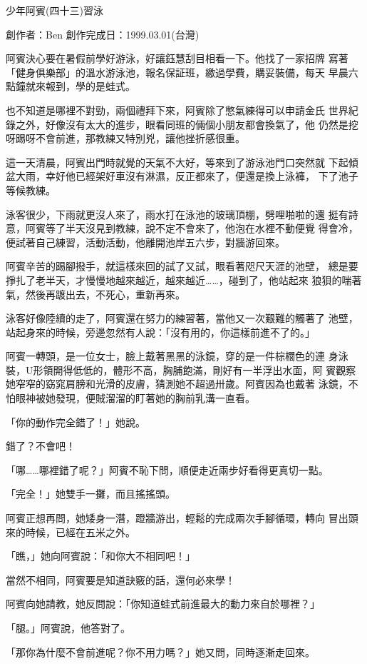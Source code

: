



少年阿賓(四十三)習泳

創作者：Ben
創作完成日：1999.03.01(台灣)


阿賓決心要在暑假前學好游泳，好讓鈺慧刮目相看一下。他找了一家招牌
寫著「健身俱樂部」的溫水游泳池，報名保証班，繳過學費，購妥裝備，每天
早晨六點鐘就來報到，學的是蛙式。

也不知道是哪裡不對勁，兩個禮拜下來，阿賓除了憋氣練得可以申請金氏
世界紀錄之外，好像沒有太大的進步，眼看同班的倆個小朋友都會換氣了，他
仍然是挖呀踢呀不會前進，那教練又特別兇，讓他挫折感很重。

這一天清晨，阿賓出門時就覺的天氣不大好，等來到了游泳池門口突然就
下起傾盆大雨，幸好他已經架好車沒有淋濕，反正都來了，便還是換上泳褲，
下了池子等候教練。

泳客很少，下雨就更沒人來了，雨水打在泳池的玻璃頂棚，劈哩啪啦的還
挺有詩意，阿賓等了半天沒見到教練，說不定不會來了，他泡在水裡不動便覺
得會冷，便試著自己練習，活動活動，他離開池岸五六步，對牆游回來。

阿賓辛苦的踢腳撥手，就這樣來回的試了又試，眼看著咫尺天涯的池壁，
總是要掙扎了老半天，才慢慢地越來越近，越來越近……，碰到了，他站起來
狼狽的喘著氣，然後再踱出去，不死心，重新再來。

泳客好像陸續的走了，阿賓還在努力的練習著，當他又一次艱難的觸著了
池壁，站起身來的時候，旁邊忽然有人說：「沒有用的，你這樣前進不了的。」

阿賓一轉頭，是一位女士，臉上戴著黑黑的泳鏡，穿的是一件棕櫚色的連
身泳裝，U形領開得低低的，體形不高，胸脯飽滿，剛好有一半浮出水面，阿
賓觀察她窄窄的窈窕肩膀和光滑的皮膚，猜測她不超過卅歲。阿賓因為也戴著
泳鏡，不怕眼神被她發現，便賊溜溜的盯著她的胸前乳溝一直看。

「你的動作完全錯了！」她說。

錯了？不會吧！

「哪……哪裡錯了呢？」阿賓不恥下問，順便走近兩步好看得更真切一點。

「完全！」她雙手一攤，而且搖搖頭。

阿賓正想再問，她矮身一潛，蹬牆游出，輕鬆的完成兩次手腳循環，轉向
冒出頭來的時候，已經在五米之外。

「瞧，」她向阿賓說：「和你大不相同吧！」

當然不相同，阿賓要是知道訣竅的話，還何必來學！

阿賓向她請教，她反問說：「你知道蛙式前進最大的動力來自於哪裡？」

「腿。」阿賓說，他答對了。

「那你為什麼不會前進呢？你不用力嗎？」她又問，同時逐漸走回來。

